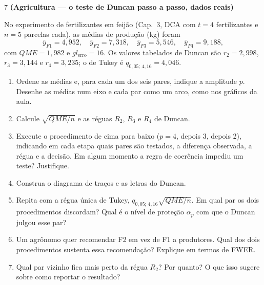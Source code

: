 \documentclass[11pt]{article}
\begin{document}
\begin{questao}{7} \textbf{(Agricultura --- o teste de Duncan passo a passo, dados reais)}

No experimento de fertilizantes em feijão (Cap.~3, DCA com $t=4$ fertilizantes e $n=5$ parcelas
cada), as médias de produção (kg) foram
\[
\bar y_{F1} = 4{,}952, \quad \bar y_{F2} = 7{,}318, \quad \bar y_{F3} = 5{,}546, \quad \bar y_{F4} = 9{,}188,
\]
com $QME = 1{,}982$ e $gl_{\text{erro}} = 16$. Os valores tabelados de Duncan são $r_2 = 2{,}998$,
$r_3 = 3{,}144$ e $r_4 = 3{,}235$; o de Tukey é $q_{0{,}05;\,4,16} = 4{,}046$.

\begin{enumerate}[label=(\alph*)]
  \item Ordene as médias e, para cada um dos seis pares, indique a amplitude $p$. Desenhe as
    médias num eixo e cada par como um arco, como nos gráficos da aula.
  \item Calcule $\sqrt{QME/n}$ e as réguas $R_2$, $R_3$ e $R_4$ de Duncan.
  \item Execute o procedimento de cima para baixo ($p = 4$, depois 3, depois 2), indicando em cada
    etapa quais pares são testados, a diferença observada, a régua e a decisão. Em algum momento a
    regra de coerência impediu um teste? Justifique.
  \item Construa o diagrama de traços e as letras do Duncan.
  \item Repita com a régua única de Tukey, $q_{0{,}05;\,4,16}\sqrt{QME/n}$. Em qual par os dois
    procedimentos discordam? Qual é o nível de proteção $\alpha_p$ com que o Duncan julgou esse par?
  \item Um agrônomo quer recomendar F2 em vez de F1 a produtores. Qual dos dois procedimentos
    sustenta essa recomendação? Explique em termos de FWER.
  \item Qual par vizinho fica mais perto da régua $R_2$? Por quanto? O que isso sugere sobre como
    reportar o resultado?
\end{enumerate}
\end{questao}
\end{document}
